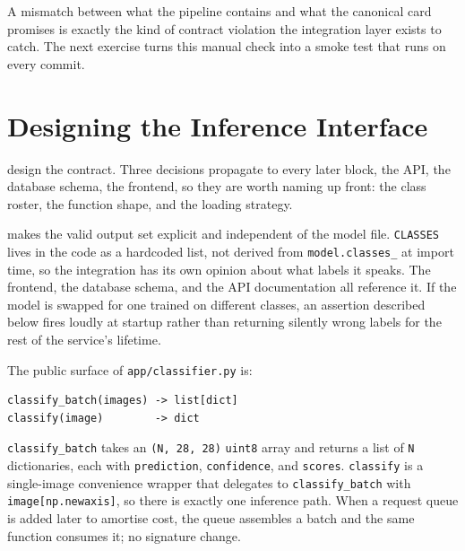 A mismatch between what the pipeline contains and what the canonical
card promises is exactly the kind of contract violation the integration
layer exists to catch.
The next exercise turns this manual check into a smoke test that runs
on every commit.



\newpage
\section{Designing the Inference Interface}

 design the contract. Three
decisions propagate to every later block, the API, the database schema,
the frontend, so they are worth naming up front: the class roster, the
function shape, and the loading strategy.


 makes the valid output set explicit
and independent of the model file. \texttt{CLASSES} lives in the code as
a hardcoded list, not derived from \texttt{model.classes\_} at import
time, so the integration has its own opinion about what labels it speaks.
The frontend, the database schema, and the API documentation all
reference it. If the model is swapped for one trained on different
classes, an assertion described below fires loudly at startup rather than
returning silently wrong labels for the rest of the service's lifetime.



 The public surface of
\texttt{app/classifier.py} is:

\begin{verbatim}
classify_batch(images) -> list[dict]
classify(image)        -> dict
\end{verbatim}

\texttt{classify\_batch} takes an \texttt{(N, 28, 28)} \texttt{uint8}
array and returns a list of \texttt{N} dictionaries, each with
\texttt{prediction}, \texttt{confidence}, and \texttt{scores}.
\texttt{classify} is a single-image convenience wrapper that delegates
to \texttt{classify\_batch} with \texttt{image[np.newaxis]}, so there is
exactly one inference path. When a request queue is added later to
amortise cost, the queue assembles a batch and the same function consumes
it; no signature change.

